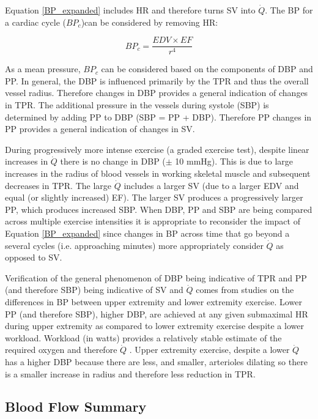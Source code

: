 Equation \ref{BP_expanded} includes HR and therefore turns SV into $\dot{Q}$. The BP for a cardiac cycle ($BP_c$)can be considered by removing HR:

\begin{equation}
    BP_c = \frac{EDV \times EF}{r^4} 
    \label{BP_cycle}
\end{equation}

As a mean pressure, $BP_c$ can be considered based on the components of DBP and PP. In general, the DBP is influenced primarily by the TPR and thus the overall vessel radius. Therefore changes in DBP provides a general indication of changes in TPR. The additional pressure in the vessels during systole (SBP) is determined by adding PP to DBP (SBP = PP + DBP). Therefore PP changes in PP provides a general indication of changes in SV.

During progressively more intense exercise (a graded exercise test), despite linear increases in $\dot{Q}$ there is no change in DBP ($\pm$ 10 mmHg). This is due to large increases in the radius of blood vessels in working skeletal muscle and subsequent decreases in TPR. The large $\dot{Q}$ includes a larger SV (due to a larger EDV and equal (or slightly increased) EF). The larger SV produces a progressively larger PP, which produces increased SBP. When DBP, PP and SBP are being compared across multiple exercise intensities it is appropriate to reconsider the impact of Equation \ref{BP_expanded} since changes in BP across time that go beyond a several cycles (i.e. approaching minutes) more appropriately consider $\dot{Q}$ as opposed to SV.

Verification of the general phenomenon of DBP being indicative of TPR and PP (and therefore SBP) being indicative of SV and $\dot{Q}$ comes from studies on the differences in BP between upper extremity and lower extremity exercise. Lower PP (and therefore SBP), higher DBP, are achieved at any given submaximal HR during upper extremity as compared to lower extremity exercise despite a lower workload. Workload (in watts) provides a relatively stable estimate of the required oxygen and therefore $\dot{Q}$ \cite{dias_differences_2022}. Upper extremity exercise, despite a lower $\dot{Q}$ has a higher DBP because there are less, and smaller, arterioles dilating so there is a smaller increase in radius and therefore less reduction in TPR.

\subsection{Blood Flow Summary}

